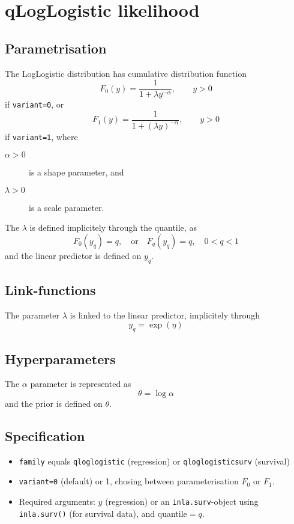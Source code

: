 \documentclass[a4paper,11pt]{article}
\begin{document}
\section*{qLogLogistic likelihood}

\subsection*{Parametrisation}

The LogLogistic distribution has cumulative distribution function
\begin{displaymath}
    F_0(y) = \frac{1}{1 + \lambda y^{-\alpha}}, \qquad y > 0
\end{displaymath}
if \texttt{variant=0}, or
\begin{displaymath}
    F_1(y) = \frac{1}{1 + (\lambda y)^{-\alpha}}, \qquad y > 0
\end{displaymath}
if \texttt{variant=1}, where
\begin{description}
\item[$\alpha > 0$] is a shape parameter, and
\item[$\lambda > 0$] is a scale parameter.
\end{description}
The $\lambda$ is defined implicitely through the quantile, as
\begin{displaymath}
    F_0(y_q) = q, \quad\text{or}\quad
    F_q(y_q) = q, \quad 0<q<1
\end{displaymath}
and the linear predictor is defined on $y_q$.

\subsection*{Link-functions}

The parameter $\lambda$ is linked to the linear predictor, implicitely through
\[
    y_q = \exp(\eta)
\]

\subsection*{Hyperparameters}

The $\alpha$ parameter is represented as
\[
    \theta = \log\alpha
\]
and the prior is defined on $\theta$.

\subsection*{Specification}

\begin{itemize}
\item \texttt{family} equals \texttt{qloglogistic} (regression) or
    \texttt{qloglogisticsurv} (survival)
\item \texttt{variant=0} (default) or 1, chosing between
    parameterisation $F_0$ or $F_1$.
\item Required arguments: $y$ (regression) or an
    \texttt{inla.surv}-object using \texttt{inla.surv()} (for survival
    data), and quantile$=q$.
\end{itemize}
\end{document}
